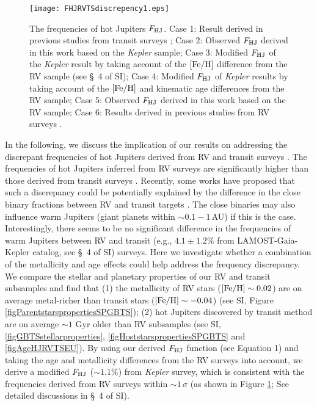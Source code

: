\documentclass[twocolumn]{pnas-new}
\begin{document}
\begin{figure}[!t]
\centering
\texttt{[image: FHJRVTSdiscrepency1.eps]}
\caption{The frequencies of hot Jupiters $F_{\rm HJ}$.
Case 1: Result derived in previous studies from transit surveys \citep[e.g.,][]{2006AcA....56....1G,2012ApJS..201...15H,2016A&A...587A..64S};
Case 2: Observed $F_{\rm HJ}$ derived in this work based on the {\it Kepler} sample;
Case 3: Modified $F_{\rm HJ}$ of the {\it Kepler} result by taking account of the $\rm [Fe/H]$ difference from the RV sample (see \S~4 of SI);
Case 4: Modified $F_{\rm HJ}$ of {\it Kepler} results by taking account of the $\rm [Fe/H]$ and kinematic age differences from the RV sample;
Case 5: Observed $F_{\rm HJ}$ derived in this work based on the RV sample;
Case 6: Results derived in previous studies from RV surveys \citep[e.g.,][]{2008PASP..120..531C,2011arXiv1109.2497M,2012ApJ...753..160W}.
\label{figFHJRVTSdiscrepency}}
\end{figure}

In the following, we discuss the implication of our results on addressing the discrepant frequencies of hot Jupiters derived from RV and transit surveys \citep[see, e.g.,][]{2021ARA&A..59..291Z}.
The frequencies of hot Jupiters inferred from RV surveys \citep[$\sim 0.9\%-1.5\%$; e.g.,][]{2008PASP..120..531C,2011arXiv1109.2497M,2012ApJ...753..160W} are significantly higher than those derived from transit surveys \citep[$\sim 0.3\%-0.8\%$; e.g.,][]{2006AcA....56....1G,2012ApJS..201...15H,2016A&A...587A..64S}.
Recently, some works have proposed that such a discrepancy could be potentially explained by the difference in the close binary fractions between RV and transit targets \citep{2021MNRAS.507.3593M,2022MNRAS.516...75B}. 
The close binaries may also influence warm Jupiters (giant planets within $\sim 0.1-1$\,AU) if this is the case.
Interestingly, there seems to be no significant difference in the frequencies of warm Jupiters between RV \citep[$\sim 4\%-5\%$;][]{2019ApJ...874...81F,2022AJ....164....5Z} and transit (e.g., $4.1 \pm 1.2\%$ from LAMOST-Gaia-Kepler catalog, see \S~4 of SI) surveys.
Here we investigate whether a combination of the metallicity and age effects could help address the frequency discrepancy. We compare the stellar and planetary properties of our RV and transit subsamples and find that (1) the metallicity of RV stars ($\rm [Fe/H] \sim 0.02$) are on average metal-richer than transit stars ($\rm [Fe/H] \sim -0.04$) (see SI, Figure \ref{figParentstarspropertiesSPGBTS}); (2) hot Jupiters discovered by transit method are on average $\sim 1$ Gyr older than RV subsamples (see SI, \ref{figGBTSstellarproperties}, \ref{figHoststarspropertiesSPGBTS} and \ref{figAgeHJRVTSEU}).
By using our derived $F_{\rm HJ}$ function (see Equation 1) and taking the age and metallicity differences from the RV surveys into account, we derive a modified $F_{\rm HJ}$ ($\sim 1.1\%$) from {\it Kepler} survey, which is consistent with the frequencies derived from RV surveys within $\sim1\,\sigma$ (as shown in Figure \ref{figFHJRVTSdiscrepency}; See detailed discussions in \S~4 of SI).
\end{document}
